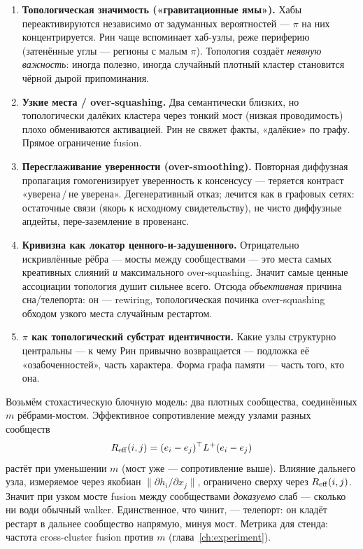 \begin{enumerate}
\item \textbf{Топологическая значимость («гравитационные ямы»).} Хабы
переактивируются независимо от задуманных вероятностей — $\pi$ на них
концентрируется. Рин чаще вспоминает хаб-узлы, реже периферию (затенённые углы —
регионы с малым $\pi$). Топология создаёт \emph{неявную важность}: иногда полезно,
иногда случайный плотный кластер становится чёрной дырой припоминания.

\item \textbf{Узкие места / over-squashing.} Два семантически близких, но
топологически далёких кластера через тонкий мост (низкая проводимость) плохо
обмениваются активацией. Рин не свяжет факты, «далёкие» по графу. Прямое ограничение
fusion.

\item \textbf{Пересглаживание уверенности (over-smoothing).} Повторная диффузная
пропагация гомогенизирует уверенность к консенсусу — теряется контраст «уверена\,/\,не
уверена». Дегенеративный отказ; лечится как в графовых сетях: остаточные связи
(якорь к исходному свидетельству), не чисто диффузные апдейты, пере-заземление в
провенанс.

\item \textbf{Кривизна как локатор ценного-и-задушенного.} Отрицательно искривлённые
рёбра — мосты между сообществами — это места самых креативных слияний \emph{и}
максимального over-squashing. Значит самые ценные ассоциации топология душит сильнее
всего. Отсюда \emph{объективная} причина сна/телепорта: он — rewiring, топологическая
починка over-squashing обходом узкого места случайным рестартом.

\item \textbf{$\pi$ как топологический субстрат идентичности.} Какие узлы структурно
центральны — к чему Рин привычно возвращается — подложка её «озабоченностей», часть
характера. Форма графа памяти — часть того, кто она.
\end{enumerate}

\begin{workedbox}
Возьмём стохастическую блочную модель: два плотных сообщества, соединённых $m$
рёбрами-мостом. Эффективное сопротивление между узлами разных сообществ
\[
R_{\mathrm{eff}}(i,j)=(e_i-e_j)^\top L^{+}(e_i-e_j)
\]
растёт при уменьшении $m$ (мост уже — сопротивление выше). Влияние дальнего узла,
измеряемое через якобиан $\big\|\partial h_i/\partial x_j\big\|$, ограничено сверху
через $R_{\mathrm{eff}}(i,j)$. Значит при узком мосте fusion между сообществами \emph{доказуемо}
слаб — сколько ни води обычный walker. Единственное, что чинит, — телепорт: он
кладёт рестарт в дальнее сообщество напрямую, минуя мост. Метрика для стенда:
частота cross-cluster fusion против $m$ (глава~\ref{ch:experiment}).
\end{workedbox}

